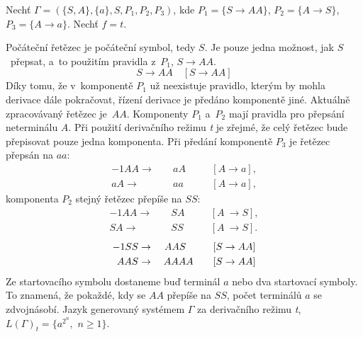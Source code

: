 \begin{example}
    Nechť $\Gamma = (\{S, A\}, \{a\}, S, P_1, P_2, P_3)$, kde $P_1 = \{S \rightarrow AA\}$, $P_2 = \{A \rightarrow S\}$, $P_3 = \{A \rightarrow a\}$.
    Nechť $f = t$.

    Počáteční řetězec je počáteční symbol, tedy $S$. 
    Je pouze jedna možnost, jak $S$~přepsat, a~to použitím pravidla z~$P_1$, $S \rightarrow AA$.
    \begin{equation*}
        S \rightarrow AA \quad [S \rightarrow AA]
    \end{equation*}
    Díky tomu, že v~komponentě $P_1$ už neexistuje pravidlo, kterým by mohla derivace dále pokračovat, řízení derivace je předáno komponentě jiné.
    Aktuálně zpracovávaný řetězec je~$AA$.
    Komponenty $P_1$ a~$P_2$ mají pravidla pro přepsání neterminálu $A$.
    Při použití derivačního režimu \emph{t} je zřejmé, že celý řetězec bude přepisovat pouze jedna komponenta.
    Při předání komponentě $P_3$ je řetězec přepsán na $aa$:
    \begin{alignat*}{-1}
        AA \rightarrow&&\; aA \quad &&[A \rightarrow a], \\
        aA \rightarrow&&\; aa \,\quad &&[A \rightarrow a],
    \end{alignat*}
    komponenta $P_2$ stejný řetězec přepíše na $SS$:
    \begin{alignat*}{-1}
        AA  \rightarrow&&\; SA && \quad [A~\rightarrow S], \\
        SA  \rightarrow&&\; SS && \quad [A~\rightarrow S]. 
    \end{alignat*}
    \begin{alignat*}{-1}
         SS \rightarrow&&\; AAS  \hphantom{A} \quad  &&[S \rightarrow AA] \\ 
        AAS \rightarrow&&\; AAAA \quad &&[S \rightarrow AA]
    \end{alignat*}
    Ze startovacího symbolu dostaneme buď terminál $a$ nebo dva startovací symboly.
    To znamená, že pokaždé, kdy se $AA$ přepíše na $SS$, počet terminálů $a$ se zdvojnásobí.
    Jazyk generovaný systémem $\Gamma$ za derivačního režimu \emph{t}, $L(\Gamma)_t = \{a^{2^n},$ $n \geq 1 \}$.
\end{example}

